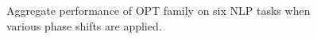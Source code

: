 \begin{figure}
    \centering
    \caption{Aggregate performance of OPT family on six NLP tasks when various phase shifts are applied.}
    \label{fig:prompt_ps_aggr}
\end{figure}
